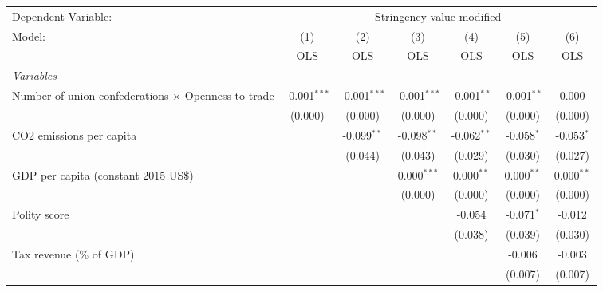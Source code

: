 
\begingroup
\centering
\begin{tabular}{lcccccc}
   \toprule
   Dependent Variable: & \multicolumn{6}{c}{Stringency value modified}\\
   Model:                                                     & (1)            & (2)            & (3)            & (4)           & (5)           & (6)\\  
                                                              &  OLS           & OLS            & OLS            & OLS           & OLS           & OLS\\  
   \midrule
   \emph{Variables}\\
   Number of union confederations $\times$ Openness to trade  & -0.001$^{***}$ & -0.001$^{***}$ & -0.001$^{***}$ & -0.001$^{**}$ & -0.001$^{**}$ & 0.000\\   
                                                              & (0.000)        & (0.000)        & (0.000)        & (0.000)       & (0.000)       & (0.000)\\   
   CO2 emissions per capita                                   &                & -0.099$^{**}$  & -0.098$^{**}$  & -0.062$^{**}$ & -0.058$^{*}$  & -0.053$^{*}$\\   
                                                              &                & (0.044)        & (0.043)        & (0.029)       & (0.030)       & (0.027)\\   
   GDP per capita (constant 2015 US\$)                        &                &                & 0.000$^{***}$  & 0.000$^{**}$  & 0.000$^{**}$  & 0.000$^{**}$\\   
                                                              &                &                & (0.000)        & (0.000)       & (0.000)       & (0.000)\\   
   Polity score                                               &                &                &                & -0.054        & -0.071$^{*}$  & -0.012\\   
                                                              &                &                &                & (0.038)       & (0.039)       & (0.030)\\   
   Tax revenue (\% of GDP)                                    &                &                &                &               & -0.006        & -0.003\\   
                                                              &                &                &                &               & (0.007)       & (0.007)\\   

\end{tabular}

